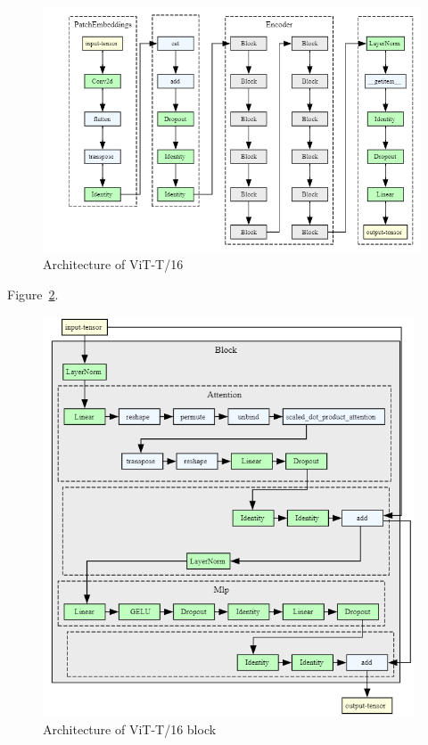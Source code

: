 \begin{figure}[H]
    \begin{center}
    \includegraphics[width=13cm]{../images/vit_t16_architecture.png}
    \caption{Architecture of ViT-T/16}\label{fig:vit_t16_architecture}
    \end{center}
\end{figure}

Figure~\ref{fig:vit_t16_architecture_block}.

\begin{figure}[H]
    \begin{center}
    \includegraphics[width=11cm]{../images/vit_t16_architecture_block.png}
    \caption{Architecture of ViT-T/16 block}\label{fig:vit_t16_architecture_block}
    \end{center}
\end{figure}


